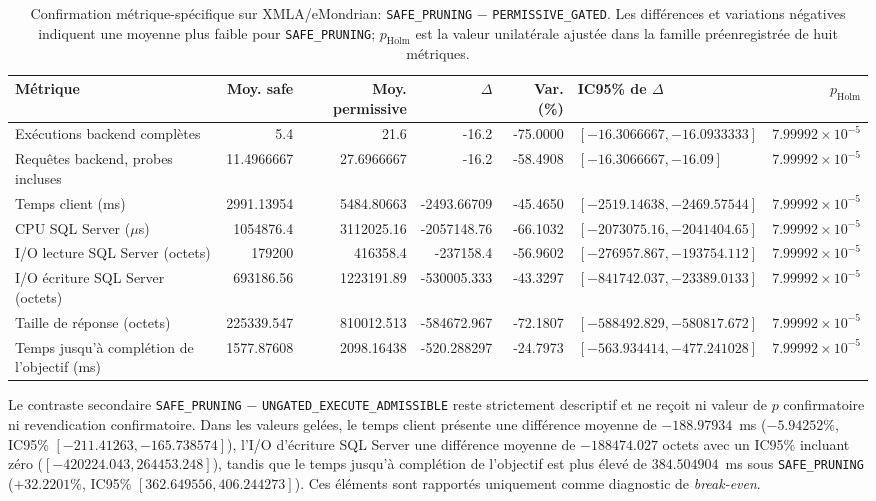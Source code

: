 \begin{table}[t]
\centering
\caption{Confirmation métrique-spécifique sur XMLA/eMondrian:
\texttt{SAFE\_PRUNING} $-$ \texttt{PERMISSIVE\_GATED}. Les différences et variations
négatives indiquent une moyenne plus faible pour \texttt{SAFE\_PRUNING}; $p_{\mathrm{Holm}}$
est la valeur unilatérale ajustée dans la famille préenregistrée de huit métriques.}
\label{tab:r3e14-xmla-primary}
\scriptsize
\setlength{\tabcolsep}{2.4pt}
\begin{tabular}{p{}rrrrp{}r}
\toprule
Métrique & Moy. safe & Moy. permissive & $\Delta$ & Var. (\%) & IC95\% de $\Delta$ & $p_{\mathrm{Holm}}$ \\
\midrule
Exécutions backend complètes
& 5.4 & 21.6 & -16.2 & -75.0000 & $[-16.3066667,-16.0933333]$ & $7.99992{\times}10^{-5}$ \\
Requêtes backend, probes incluses
& 11.4966667 & 27.6966667 & -16.2 & -58.4908 & $[-16.3066667,-16.09]$ & $7.99992{\times}10^{-5}$ \\
Temps client (ms)
& 2991.13954 & 5484.80663 & -2493.66709 & -45.4650 & $[-2519.14638,-2469.57544]$ & $7.99992{\times}10^{-5}$ \\
CPU SQL Server ($\mu$s)
& 1054876.4 & 3112025.16 & -2057148.76 & -66.1032 & $[-2073075.16,-2041404.65]$ & $7.99992{\times}10^{-5}$ \\
I/O lecture SQL Server (octets)
& 179200 & 416358.4 & -237158.4 & -56.9602 & $[-276957.867,-193754.112]$ & $7.99992{\times}10^{-5}$ \\
I/O écriture SQL Server (octets)
& 693186.56 & 1223191.89 & -530005.333 & -43.3297 & $[-841742.037,-23389.0133]$ & $7.99992{\times}10^{-5}$ \\
Taille de réponse (octets)
& 225339.547 & 810012.513 & -584672.967 & -72.1807 & $[-588492.829,-580817.672]$ & $7.99992{\times}10^{-5}$ \\
Temps jusqu'à complétion de l'objectif (ms)
& 1577.87608 & 2098.16438 & -520.288297 & -24.7973 & $[-563.934414,-477.241028]$ & $7.99992{\times}10^{-5}$ \\
\bottomrule
\end{tabular}
\end{table}

Le contraste secondaire \texttt{SAFE\_PRUNING} $-$
\texttt{UNGATED\_EXECUTE\_ADMISSIBLE} reste strictement descriptif et ne reçoit ni
valeur de $p$ confirmatoire ni revendication confirmatoire. Dans les valeurs gelées, le temps
client présente une différence moyenne de $-188.97934$~ms ($-5.94252\%$,
IC95\% $[-211.41263,-165.738574]$), l'I/O d'écriture SQL Server une différence moyenne
de $-188474.027$ octets avec un IC95\% incluant zéro
($[-420224.043,264453.248]$), tandis que le temps jusqu'à complétion de l'objectif est
plus élevé de $384.504904$~ms sous \texttt{SAFE\_PRUNING} ($+32.2201\%$,
IC95\% $[362.649556,406.244273]$). Ces éléments sont rapportés uniquement comme
diagnostic de \emph{break-even}.

